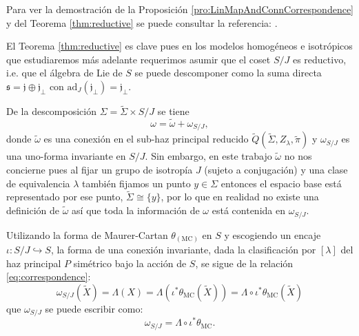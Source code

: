 Para ver la demostraci\'{o}n de la Proposici\'{o}n \autoref{pro:LinMapAndConnCorrespondence} y del Teorema \autoref{thm:reductive} se puede consultar la referencia: \cite{Kobayashi}.

El Teorema \autoref{thm:reductive} es clave pues en los modelos homog\'{e}neos e isotr\'{o}picos que estudiaremos m\'{a}s adelante requerimos asumir que el coset $S/J$ es reductivo, i.e. que el  \'{a}lgebra de Lie de $S$ se puede descomponer como la suma directa $\mathfrak{s} = \mathfrak{j} \oplus \mathfrak{j}_{\perp}$ con $\mathrm{ad}_{J}(\mathfrak{j_{\perp}}) = \mathfrak{j_{\perp}}$.

De la descomposici\'{o}n $\Sigma = \tilde{\Sigma} \times S/J$ se tiene
%
\begin{equation}
\omega = \tilde{\omega} + \omega_{S/J},
\end{equation}
%
donde $\tilde{\omega}$ es una conexi\'{o}n en el sub-haz principal reducido $\tilde{Q}(\tilde{\Sigma}, Z_{\lambda}, \tilde{\pi})$ y $\omega_{S/J}$ es una uno-forma invariante en $S/J$. Sin embargo, en este trabajo $\tilde{\omega}$ no nos concierne pues al fijar un grupo de isotrop\'{i}a $J$ (sujeto a conjugaci\'{o}n) y una clase de equivalencia $\lambda$ tambi\'{e}n fijamos un punto $y \in \Sigma$ entonces el espacio base est\'{a} representado por ese punto, $\tilde{\Sigma} \cong \{y\}$, por lo que en realidad no existe una definici\'{o}n de $\tilde{\omega}$ as\'{i} que toda la informaci\'{o}n de $\omega$ est\'{a} contenida en $\omega_{S/J}$.

Utilizando la forma de Maurer-Cartan $\theta_{(\mathrm{MC})}$ en $S$ y escogiendo un encaje $\iota: S/J \hookrightarrow S$, la forma de una conexi\'{o}n invariante, dada la clasificaci\'{o}n por $[\lambda]$ del haz principal $P$ sim\'{e}trico bajo la acci\'{o}n de $S$, se sigue de la relaci\'{o}n \eqref{eq:correspondence}:
%
\begin{equation*}
\omega_{S/J} (\tilde{X}) = \Lambda (X) = \Lambda (\iota^{*} \theta_{\mathrm{MC}} (\tilde{X})) = \Lambda \circ \iota^{*} \theta_{\mathrm{MC}} (\tilde{X})
\end{equation*}
%
que $\omega_{S/J}$ se puede escribir como:
%
\begin{equation}
\omega_{S/J} = \Lambda \circ \iota^{*} \theta_{\mathrm{MC}}.
\end{equation}